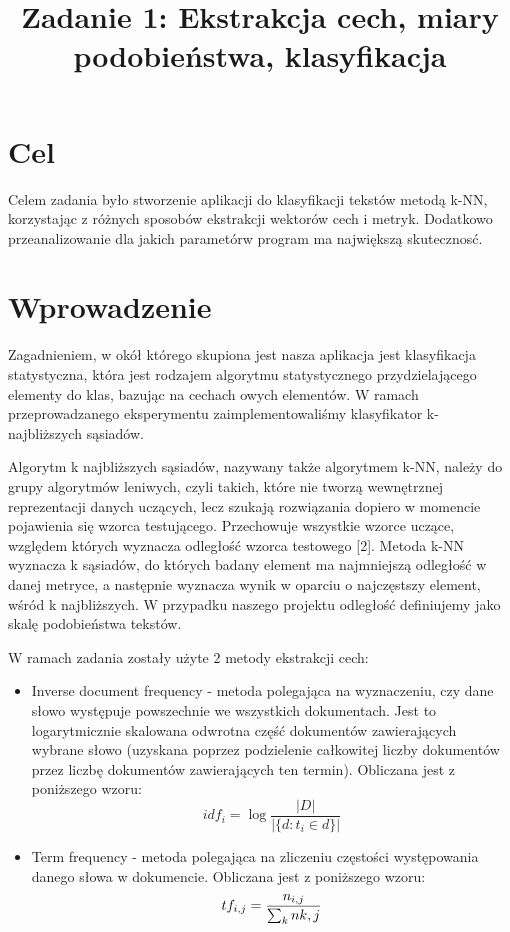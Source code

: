 \documentclass{classrep}
\author{
  \studentinfo{Piotr Traczyk}{123123} \and
  \studentinfo{Bartosz Jurczewski}{210209}
}
\title{Zadanie 1: Ekstrakcja cech, miary podobieństwa, klasyfikacja}
\begin{document}
\maketitle


\section{Cel}
Celem zadania było stworzenie aplikacji do klasyfikacji tekstów metodą k-NN, korzystając z różnych sposobów ekstrakcji wektorów cech i metryk.
Dodatkowo przeanalizowanie dla jakich parametórw program ma największą skutecznosć.

\section{Wprowadzenie}
Zagadnieniem, w okół którego skupiona jest nasza aplikacja jest klasyfikacja statystyczna, która jest rodzajem algorytmu statystycznego przydzielającego elementy do klas, bazując na cechach owych elementów. W ramach przeprowadzanego eksperymentu zaimplementowaliśmy klasyfikator k-najbliższych sąsiadów. \newline

Algorytm k najbliższych sąsiadów, nazywany także algorytmem k-NN, należy do grupy algorytmów leniwych, czyli takich, które nie tworzą wewnętrznej reprezentacji danych uczących, lecz szukają rozwiązania dopiero w momencie pojawienia się wzorca testującego. Przechowuje wszystkie wzorce uczące, względem których wyznacza odległość wzorca testowego [2]. Metoda k-NN wyznacza k sąsiadów, do których badany element ma najmniejszą odległość w danej metryce, a następnie wyznacza wynik w oparciu o najczęstszy element, wśród k najbliższych. W przypadku naszego projektu odległość definiujemy jako skalę podobieństwa tekstów. \newline

W ramach zadania zostały użyte 2 metody ekstrakcji cech: \newline
\begin{itemize}[label=$\circ$]

\item Inverse document frequency - metoda polegająca na wyznaczeniu, czy dane słowo występuje powszechnie we wszystkich dokumentach. Jest to logarytmicznie skalowana odwrotna część dokumentów zawierających wybrane słowo (uzyskana poprzez podzielenie całkowitej liczby dokumentów przez liczbę dokumentów zawierających ten termin). Obliczana jest z poniższego wzoru:
$$
idf_{i}
= \log\frac{|D|}{|\{d : t_{i} \in d\}|}
$$

\item Term frequency - metoda polegająca na zliczeniu częstości występowania danego słowa w dokumencie. Obliczana jest z poniższego wzoru:
$$
tf_{i,j}
= \frac{n_{i,j}}{\sum_{k}n{k,j}}\\[2\baselineskip]
$$
\end{itemize}
\end{document}
